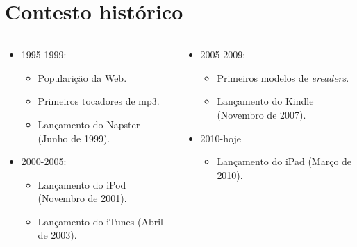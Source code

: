 \documentclass[11pt]{beamer}
\newcommand{\flang}[1]{\textit{#1}}
\begin{document}
\begin{frame}
    \tableofcontents
\end{frame}

\section{Contesto histórico}
\begin{frame}
  \begin{columns}
    \begin{column}[t]{.4\textwidth}
      \begin{itemize}
        \item 1995-1999:
          \pause
          \begin{itemize}
            \item Popularição da Web.
              \pause
            \item Primeiros tocadores de mp3.
              \pause
            \item Lançamento do Napster (Junho de 1999).
              \pause
          \end{itemize}
        \item 2000-2005:
          \pause
          \begin{itemize}
            \item Lançamento do iPod (Novembro de 2001).
              \pause
            \item Lançamento do iTunes (Abril de 2003).
              \pause
          \end{itemize}
      \end{itemize}
    \end{column}
    \begin{column}[t]{.4\textwidth}
      \begin{itemize}
        \item 2005-2009:
          \pause
          \begin{itemize}
            \item Primeiros modelos de \flang{ereaders}.
              \pause
            \item Lançamento do Kindle (Novembro de 2007).
              \pause
          \end{itemize}
          \item 2010-hoje
            \pause
            \begin{itemize}
              \item Lançamento do iPad (Março de 2010).
            \end{itemize}
        \end{itemize}
    \end{column}
  \end{columns}
\end{frame}
\end{document}
